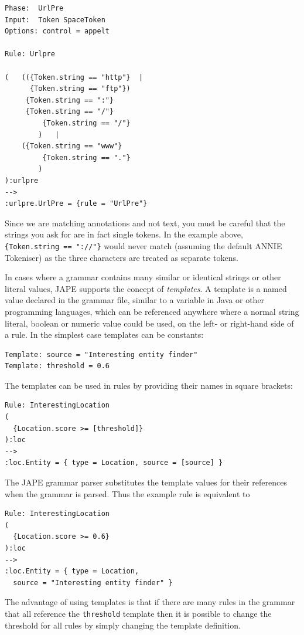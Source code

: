 \begin{small}
\begin{verbatim}
Phase:	UrlPre
Input:  Token SpaceToken
Options: control = appelt

Rule: Urlpre

(	(({Token.string == "http"}	|
	  {Token.string == "ftp"})
	 {Token.string == ":"}
	 {Token.string == "/"}
         {Token.string == "/"}
        )	|
	({Token.string == "www"}
         {Token.string == "."}
        )
):urlpre
-->
:urlpre.UrlPre = {rule = "UrlPre"}
\end{verbatim}
\end{small}

Since we are matching annotations and not text, you must be careful that the
strings you ask for are in fact single tokens.  In the example above,
\verb|{Token.string == "://"}| would never match (assuming the default ANNIE
Tokeniser) as the three characters are treated as separate tokens.


In cases where a grammar contains many similar or identical strings or other
literal values, JAPE supports the concept of {\it templates}.  A template is a
named value declared in the grammar file, similar to a variable in Java or
other programming languages, which can be referenced anywhere where a normal
string literal, boolean or numeric value could be used, on the left- or
right-hand side of a rule.  In the simplest case templates can be constants:
\begin{small}
\begin{verbatim}
Template: source = "Interesting entity finder"
Template: threshold = 0.6
\end{verbatim}
\end{small}
%
The templates can be used in rules by providing their names in square brackets:
\begin{small}
\begin{verbatim}
Rule: InterestingLocation
(
  {Location.score >= [threshold]}
):loc
-->
:loc.Entity = { type = Location, source = [source] }
\end{verbatim}
\end{small}
%
The JAPE grammar parser substitutes the template values for their references
when the grammar is parsed.  Thus the example rule is equivalent to
\begin{small}
\begin{verbatim}
Rule: InterestingLocation
(
  {Location.score >= 0.6}
):loc
-->
:loc.Entity = { type = Location,
  source = "Interesting entity finder" }
\end{verbatim}
\end{small}
%
The advantage of using templates is that if there are many rules in the grammar
that all reference the {\tt threshold} template then it is possible to change
the threshold for all rules by simply changing the template definition.

